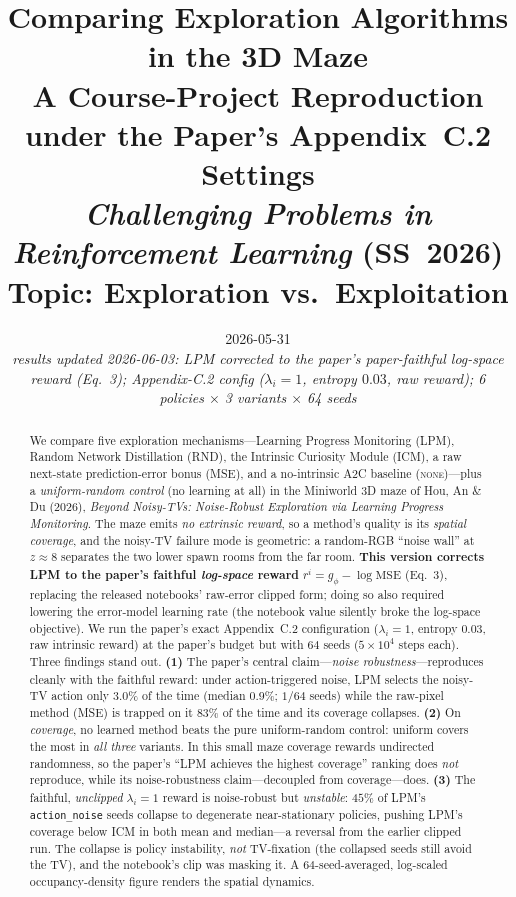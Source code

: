 \documentclass[11pt]{article}
\title{\textbf{Comparing Exploration Algorithms in the 3D Maze}\\
\large A Course-Project Reproduction under the Paper's Appendix~C.2 Settings\\
\normalsize \emph{Challenging Problems in Reinforcement Learning} (SS~2026)\\
\normalsize Topic: Exploration vs.\ Exploitation}
\author{}
\date{2026-05-31\\ \normalsize\emph{results updated 2026-06-03: LPM corrected to the paper's
paper-faithful \emph{log-space} reward (Eq.~3); Appendix-C.2 config ($\lambda_i{=}1$, entropy
$0.03$, raw reward); 6 policies $\times$ 3 variants $\times$ 64 seeds}}
\begin{document}
\maketitle

\begin{abstract}
\noindent We compare five exploration mechanisms---Learning Progress Monitoring (LPM), Random
Network Distillation (RND), the Intrinsic Curiosity Module (ICM), a raw next-state prediction-error
bonus (MSE), and a no-intrinsic A2C baseline (\textsc{none})---plus a \emph{uniform-random control}
(no learning at all) in the Miniworld 3D maze of Hou, An \& Du (2026), \emph{Beyond Noisy-TVs:
Noise-Robust Exploration via Learning Progress Monitoring}. The maze emits \emph{no extrinsic
reward}, so a method's quality is its \emph{spatial coverage}, and the noisy-TV failure mode is
geometric: a random-RGB ``noise wall'' at $z\approx 8$ separates the two lower spawn rooms from the
far room. \textbf{This version corrects LPM to the paper's faithful \emph{log-space} reward}
$r^i=g_\phi-\log\mathrm{MSE}$ (Eq.~3), replacing the released notebooks' raw-error clipped form; doing
so also required lowering the error-model learning rate (the notebook value silently broke the
log-space objective). We run the paper's exact Appendix~C.2 configuration ($\lambda_i{=}1$, entropy
$0.03$, raw intrinsic reward) at the paper's budget but with $64$ seeds ($5\times10^{4}$ steps each).
Three findings stand out. \textbf{(1)} The paper's central claim---\emph{noise robustness}---reproduces
cleanly with the faithful reward: under action-triggered noise, LPM selects the noisy-TV action only
$3.0\%$ of the time (median $0.9\%$; $1/64$ seeds) while the raw-pixel method (MSE) is trapped on it
$83\%$ of the time and its coverage collapses. \textbf{(2)} On \emph{coverage}, no learned method
beats the pure uniform-random control: uniform covers the most in \emph{all three} variants. In this
small maze coverage rewards undirected randomness, so the paper's ``LPM achieves the highest
coverage'' ranking does \emph{not} reproduce, while its noise-robustness claim---decoupled from
coverage---does. \textbf{(3)} The faithful, \emph{unclipped} $\lambda_i{=}1$ reward is noise-robust but
\emph{unstable}: $45\%$ of LPM's \texttt{action\_noise} seeds collapse to degenerate near-stationary
policies, pushing LPM's coverage below ICM in both mean and median---a reversal from the earlier
clipped run. The collapse is policy instability, \emph{not} TV-fixation (the collapsed seeds still
avoid the TV), and the notebook's clip was masking it. A $64$-seed-averaged, log-scaled
occupancy-density figure renders the spatial dynamics.
\end{abstract}
\end{document}
